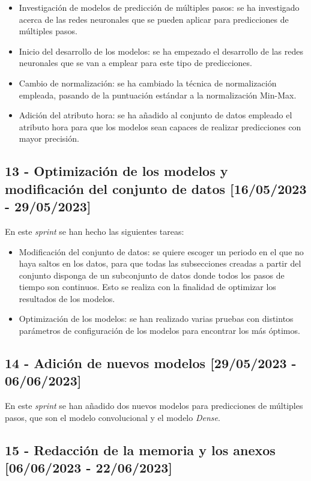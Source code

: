 \begin{itemize}
    \item Investigación de modelos de predicción de múltiples pasos: se ha investigado acerca de las redes neuronales que se pueden aplicar para predicciones de múltiples pasos.
    \item Inicio del desarrollo de los modelos: se ha empezado el desarrollo de las redes neuronales que se van a emplear para este tipo de predicciones.
    \item Cambio de normalización: se ha cambiado la técnica de normalización empleada, pasando de la puntuación estándar a la normalización Min-Max.
    \item Adición del atributo hora: se ha añadido al conjunto de datos empleado el atributo hora para que los modelos sean capaces de realizar predicciones con mayor precisión.
\end{itemize}

\subsection{13 - Optimización de los modelos y modificación del conjunto de datos [16/05/2023 - 29/05/2023]}

En este \textit{sprint} se han hecho las siguientes tareas:

\begin{itemize}
    \item Modificación del conjunto de datos: se quiere escoger un periodo en el que no haya saltos en los datos, para que todas las subsecciones creadas a partir del conjunto disponga de un subconjunto de datos donde todos los pasos de tiempo son continuos. Esto se realiza con la finalidad de optimizar los resultados de los modelos.
    \item Optimización de los modelos: se han realizado varias pruebas con distintos parámetros de configuración de los modelos para encontrar los más óptimos.
\end{itemize}

\subsection{14 - Adición de nuevos modelos [29/05/2023 - 06/06/2023]}

En este \textit{sprint} se han añadido dos nuevos modelos para predicciones de múltiples pasos, que son el modelo convolucional y el modelo \textit{Dense}.

\subsection{15 - Redacción de la memoria y los anexos [06/06/2023 - 22/06/2023]}

